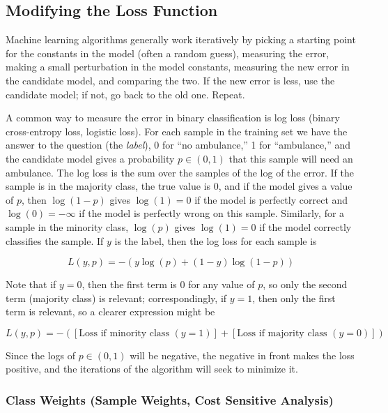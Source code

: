 \subsection{Modifying the Loss Function}

Machine learning algorithms generally work iteratively by picking a starting point for the constants in the model (often a random guess), measuring the error, making a small perturbation in the model constants, measuring the new error in the candidate model, and comparing the two.  If the new error is less, use the candidate model; if not, go back to the old one.  Repeat.  

A common way to measure the error in binary classification is log loss (binary cross-entropy loss, logistic loss).  For each sample in the training set we have the answer to the question (the {\it label}), 0 for ``no ambulance,'' 1 for ``ambulance,'' and the candidate model gives a probability $p \in (0,1)$ that this sample will need an ambulance.  The log loss is the sum over the samples of the log of the error.  If the sample is in the majority class, the true value is 0, and if the model gives a value of $p$, then $\log(1-p)$ gives $\log(1)=0$ if the model is perfectly correct and $\log(0) = -\infty$ if the model is perfectly wrong on this sample.  Similarly, for a sample in the minority class, $\log(p)$ gives $\log(1) = 0$ if the model correctly classifies the sample.  If $y$ is the label, then the log loss for each sample is \citep{scikit-learn}

$$L(y,p) = -
	\left( 
		y \log \left( p \right) + \left( 1-y \right) \log \left( 1-p \right) 
	\right) 
$$

Note that if $y=0$, then the first term is 0 for any value of $p$, so only the second term (majority class) is relevant; correspondingly, if $y=1$, then only the first term is relevant, so a clearer expression might be

$$L(y,p) = - 
	\left( 
		\left[ 
			\text{Loss if minority class } (y=1) 
		\right] + 
		\left[
			\text{Loss if majority class } (y=0)
		\right]
	\right) 
$$


 Since the logs of $p \in (0,1)$ will be negative, the negative in front makes the loss positive, and the iterations of the algorithm will seek to minimize it.  

\subsubsection{Class Weights (Sample Weights, Cost Sensitive Analysis)}

